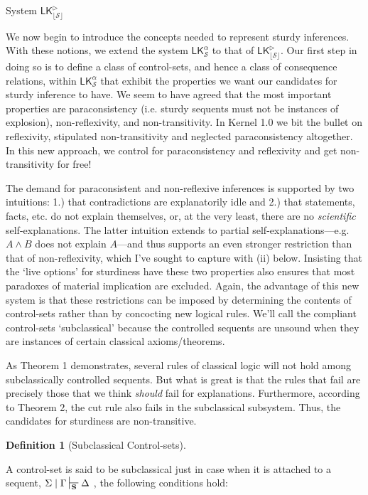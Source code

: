 \documentclass{article}                     %
\theoremstyle{theorem}
\theoremstyle{corollary}
\theoremstyle{lemma}
\theoremstyle{definition}
\newtheorem{definition}[section]{Definition}
\theoremstyle{remark}
\theoremstyle{definition}
\theoremstyle{notation}
\theoremstyle{definition}
\theoremstyle{proposition}
\theoremstyle{definition}
\begin{document}
\newpage



{\large System $ \mathsf{LK}^{\rhd}_{\mathcal{\lfloor S \rfloor}} $ }
\vspace{2mm}

We now begin to introduce the concepts needed to represent sturdy inferences. With these notions, we extend the system $ \mathsf{LK}^\alpha_\mathcal{S} $ to that of $ \mathsf{LK}^\rhd_\mathcal{\lfloor S \rfloor} $. Our first step in doing so is to define a class of control-sets, and hence a class of consequence relations, within $ \mathsf{LK}^\alpha_\mathcal{S} $ that exhibit the properties we want our candidates for sturdy inference to have. We seem to have agreed that the most important properties are paraconsistency (i.e. sturdy sequents must not be instances of explosion), non-reflexivity, and non-transitivity. In Kernel 1.0 we bit the bullet on reflexivity, stipulated non-transitivity and neglected paraconsistency altogether. In this new approach, we control for paraconsistency and reflexivity and get non-transitivity for free!

The demand for paraconsistent and non-reflexive inferences is supported by two intuitions: 1.) that contradictions are explanatorily idle and 2.) that statements, facts, etc. do not explain themselves, or, at the very least, there are no \textit{scientific} self-explanations. The latter intuition extends to partial self-explanations---e.g. $A \wedge B $ does not explain $A$---and thus supports an even stronger restriction than that of non-reflexivity, which I've sought to capture with (ii) below. Insisting that the `live options' for sturdiness have these two properties also ensures that most paradoxes of material implication are excluded. Again, the advantage of this new system is that these restrictions can be imposed by determining the contents of control-sets rather than by concocting new logical rules. We'll call the compliant control-sets `subclassical' because the controlled sequents are unsound when they are instances of certain classical axioms/theorems. 

As Theorem 1 demonstrates, several rules of classical logic will not hold among subclassically controlled sequents. But what is great is that the rules that fail are precisely those that we think \textit{should} fail for explanations. Furthermore, according to Theorem 2, the cut rule also fails in the subclassical subsystem. Thus, the candidates for sturdiness are non-transitive.

\begin{definition}[Subclassical Control-sets] \label{Sc_Cs} 

A control-set is said to be subclassical just in case when it is attached to a sequent, $ \Sigma\mid\Gamma\sststile{\mathbf{S}}{} \Delta $ , the following conditions hold:

\end{definition}
\end{document}
